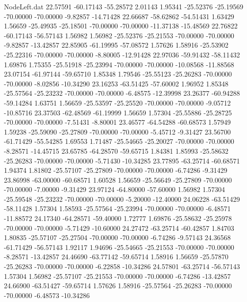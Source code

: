 \begin{filecontents}{NodeLeft.dat}
  22.57591  -60.17143  -55.28572     2.01143    1.95341  -25.52376  -25.19569  -70.00000  -70.00000   -9.82857  -14.71428
  22.66687  -58.62862  -54.51431     1.63429    1.56659  -25.49935  -25.18501  -70.00000  -70.00000  -11.37138  -15.48569
  22.76822  -60.17143  -56.57143     1.56982    1.56982  -25.52376  -25.21553  -70.00000  -70.00000   -9.82857  -13.42857
  22.85905  -61.19995  -57.08572     1.57626    1.58916  -25.53902  -25.22316  -70.00000  -70.00000   -8.80005  -12.91428
  22.97036  -59.91432  -58.11432     1.69876    1.75355  -25.51918  -25.23994  -70.00000  -70.00000  -10.08568  -11.88568
  23.07154  -61.97144  -59.65710     1.85348    1.79546  -25.55123  -25.26283  -70.00000  -70.00000   -8.02856  -10.34290
  23.16253  -63.51425  -57.60002     1.96952    1.85348  -25.57564  -25.23232  -70.00000  -70.00000   -6.48575  -12.39998
  23.26377  -60.94288  -59.14284     1.63751    1.56659  -25.53597  -25.25520  -70.00000  -70.00000   -9.05712  -10.85716
  23.37503  -62.48569  -61.19999     1.56659    1.57304  -25.55886  -25.28725  -70.00000  -70.00000   -7.51431   -8.80001
  23.46577  -64.54288  -60.68573     1.57949    1.59238  -25.59090  -25.27809  -70.00000  -70.00000   -5.45712   -9.31427
  23.56700  -61.71429  -55.54285     1.69553    1.71487  -25.54665  -25.20027  -70.00000  -70.00000   -8.28571  -14.45715
  23.65785  -64.28570  -59.65715     1.84381    1.85993  -25.58632  -25.26283  -70.00000  -70.00000   -5.71430  -10.34285
  23.77895  -63.25714  -60.68571     1.94374    1.81802  -25.57107  -25.27809  -70.00000  -70.00000   -6.74286   -9.31429
  23.86998  -63.00000  -60.68571     1.60528    1.56659  -25.56649  -25.27809  -70.00000  -70.00000   -7.00000   -9.31429
  23.97124  -64.80000  -57.60000     1.56982    1.57304  -25.59548  -25.23232  -70.00000  -70.00000   -5.20000  -12.40000
  24.06228  -63.51429  -58.11428     1.57304    1.58593  -25.57564  -25.23994  -70.00000  -70.00000   -6.48571  -11.88572
  24.17340  -64.28571  -59.40000     1.72777    1.69876  -25.58632  -25.25978  -70.00000  -70.00000   -5.71429  -10.60000
  24.27472  -63.25714  -60.42857     1.84703    1.80835  -25.57107  -25.27504  -70.00000  -70.00000   -6.74286   -9.57143
  24.36568  -61.71429  -56.57143     1.92117    1.94696  -25.54665  -25.21553  -70.00000  -70.00000   -8.28571  -13.42857
  24.46690  -63.77142  -59.65714     1.58916    1.56659  -25.57870  -25.26283  -70.00000  -70.00000   -6.22858  -10.34286
  24.57801  -63.25714  -56.57143     1.57304    1.56982  -25.57107  -25.21553  -70.00000  -70.00000   -6.74286  -13.42857
  24.66900  -63.51427  -59.65714     1.57626    1.58916  -25.57564  -25.26283  -70.00000  -70.00000   -6.48573  -10.34286

\end{filecontents}
